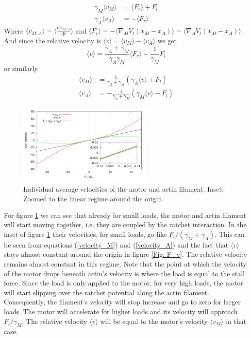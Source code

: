 \documentclass[aps,pre,onecolumn,showpacs,showkeys,a4paper]{revtex4}
\newcommand{\rmd}{{\mathrm d}}
\begin{document}
\begin{align*}
\gamma_M \langle v_M \rangle &= \langle F_r \rangle + F_l \\
\gamma_A \langle v_A \rangle &= -\langle F_r \rangle
\end{align*}
Where $\langle v_{M,A} \rangle = \langle \frac{\rmd x_{M,A}}{\rmd t} \rangle$ and $\langle F_r \rangle = - \langle \nabla_M V_t(x_M - x_A ) \rangle =\langle \nabla_A V_t(x_M - x_A ) \rangle $. And since the relative velocity is $\langle v \rangle = \langle v_{M} \rangle - \langle v_{A} \rangle$ we get
\begin{equation*}
\langle v \rangle = \frac{\gamma_A + \gamma_M}{\gamma_A\gamma_M} \langle F_r \rangle + \frac{1}{\gamma_M}F_l
\end{equation*}
or similarly
\begin{eqnarray*}
\langle v_M \rangle &= \frac{1}{\gamma_A + \gamma_M}\left(\gamma_A \langle v \rangle + F_l\right) \label{velocity_M}\\
\langle v_A \rangle &= -\frac{1}{\gamma_A + \gamma_M}\left(\gamma_M \langle v \rangle - F_l\right)
\label{velocity_A}
\end{eqnarray*}

\begin{figure}[h]
\centering
\includegraphics[width=0.6\textwidth,height=!]{individual_velocities}
\caption{Individual average velocities of the motor and actin filament. Inset: Zoomed to the linear regime around the origin.}
\label{Fig: ind_v} 
\end{figure}
For figure \ref{Fig: ind_v} we can see that already for small loads, the motor and actin filament will start moving together, i.e. they are coupled by the ratchet interaction. In the inset of figure \ref{Fig: ind_v} their velocities, for small loads, go like $F_l/(\gamma_M + \gamma_A)$. This can be seen from equations (\ref{velocity_M}) and (\ref{velocity_A}) and the fact that $\langle v \rangle$ stays almost constant around the origin in figure \ref{Fig: F_v}. The relative velocity remains almost constant in this regime.
Note that the point at which the velocity of the motor drops beneath actin's velocity is where the load is equal to the stall force.
Since the load is only applied to the motor, for very high loads, the motor will start slipping over the ratchet potential along the actin filament. Consequently, the filament's velocity will stop increase and go to zero for larger loads. The motor will accelerate for higher loads and its velocity will approach $F_l/\gamma_M$. The relative velocity $\langle v \rangle$ will be equal to the motor's velocity $\langle v_M \rangle$ in that case.
\end{document}
